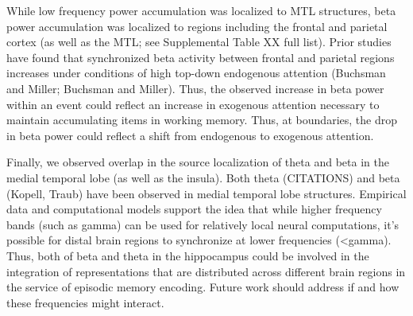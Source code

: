 While low frequency power accumulation was localized to MTL structures,
beta power accumulation was localized to regions including the frontal
and parietal cortex (as well as the MTL; see Supplemental Table XX full
list). Prior studies have found that synchronized beta activity between
frontal and parietal regions increases under conditions of high top-down
endogenous attention (Buchsman and Miller; Buchsman and Miller). Thus,
the observed increase in beta power within an event could reflect an
increase in exogenous attention necessary to maintain accumulating items
in working memory. Thus, at boundaries, the drop in beta power could
reflect a shift from endogenous to exogenous attention.

Finally, we observed overlap in the source localization of theta and
beta in the medial temporal lobe (as well as the insula). Both theta
(CITATIONS) and beta (Kopell, Traub) have been observed in medial
temporal lobe structures. Empirical data and computational models
support the idea that while higher frequency bands (such as gamma) can
be used for relatively local neural computations, it's possible for
distal brain regions to synchronize at lower frequencies
(\textless{}gamma). Thus, both of beta and theta in the hippocampus
could be involved in the integration of representations that are
distributed across different brain regions in the service of episodic
memory encoding. Future work should address if and how these frequencies
might interact.
